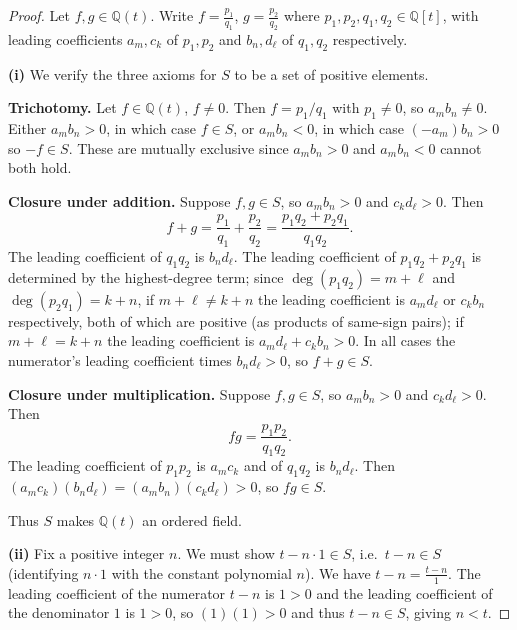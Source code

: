 \begin{proof}
    Let $f, g \in \mathbb{Q}(t)$.
    Write $f = \frac{p_1}{q_1}$, $g = \frac{p_2}{q_2}$
        where $p_1, p_2, q_1, q_2 \in \mathbb{Q}[t]$,
        with leading coefficients $a_m, c_k$ of $p_1, p_2$
        and $b_n, d_\ell$ of $q_1, q_2$ respectively.

    \textbf{(i)} We verify the three axioms for $S$ to be a set of positive elements.

    \textbf{Trichotomy.} Let $f \in \mathbb{Q}(t)$, $f \neq 0$.
    Then $f = p_1/q_1$ with $p_1 \neq 0$, so $a_m b_n \neq 0$.
    Either $a_m b_n > 0$, in which case $f \in S$,
    or $a_m b_n < 0$, in which case $(-a_m) b_n > 0$ so $-f \in S$.
    These are mutually exclusive since $a_m b_n > 0$ and $a_m b_n < 0$ cannot both hold.

    \textbf{Closure under addition.} Suppose $f, g \in S$, so $a_m b_n > 0$ and $c_k d_\ell > 0$.
    Then
    \[
        f + g = \frac{p_1}{q_1} + \frac{p_2}{q_2} = \frac{p_1 q_2 + p_2 q_1}{q_1 q_2}.
    \]
    The leading coefficient of $q_1 q_2$ is $b_n d_\ell$.
    The leading coefficient of $p_1 q_2 + p_2 q_1$ is determined by the highest-degree term;
    since $\deg(p_1 q_2) = m + \ell$ and $\deg(p_2 q_1) = k + n$,
    if $m + \ell \neq k + n$ the leading coefficient is $a_m d_\ell$ or $c_k b_n$ respectively,
    both of which are positive (as products of same-sign pairs);
    if $m + \ell = k + n$ the leading coefficient is $a_m d_\ell + c_k b_n > 0$.
    In all cases the numerator's leading coefficient times $b_n d_\ell > 0$, so $f + g \in S$.

    \textbf{Closure under multiplication.} Suppose $f, g \in S$, so $a_m b_n > 0$ and $c_k d_\ell > 0$.
    Then
    \[
        fg = \frac{p_1 p_2}{q_1 q_2}.
    \]
    The leading coefficient of $p_1 p_2$ is $a_m c_k$ and of $q_1 q_2$ is $b_n d_\ell$.
    Then $(a_m c_k)(b_n d_\ell) = (a_m b_n)(c_k d_\ell) > 0$, so $fg \in S$.

    Thus $S$ makes $\mathbb{Q}(t)$ an ordered field.

    \textbf{(ii)} Fix a positive integer $n$. We must show $t - n \cdot 1 \in S$,
    i.e.\ $t - n \in S$ (identifying $n \cdot 1$ with the constant polynomial $n$).
    We have $t - n = \frac{t - n}{1}$.
    The leading coefficient of the numerator $t - n$ is $1 > 0$
    and the leading coefficient of the denominator $1$ is $1 > 0$,
    so $(1)(1) > 0$ and thus $t - n \in S$, giving $n < t$.
\end{proof}

